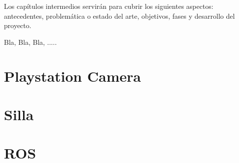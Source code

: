 


Los capítulos intermedios servirán para cubrir los siguientes aspectos:
antecedentes, problemática o estado del arte, objetivos, fases y desarrollo del proyecto.

Bla, Bla, Bla, .....

\section{Playstation Camera}
\label{3:sec1}

\section{Silla}
\label{3:sec2}

\section{ROS}
\label{3:sec3}
